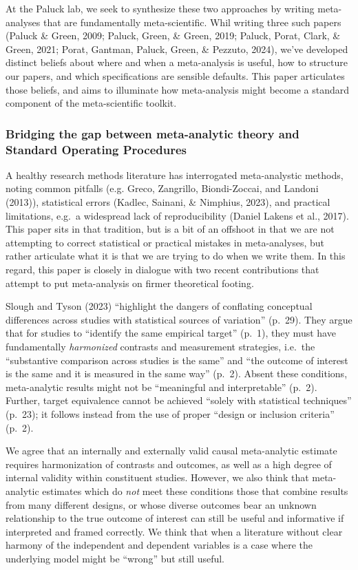 \documentclass[
  man]{apa6}
\begin{document}
At the Paluck lab, we seek to synthesize these two approaches by writing meta-analyses that are fundamentally meta-scientific. Whil writing three such papers (Paluck \& Green, 2009; Paluck, Green, \& Green, 2019; Paluck, Porat, Clark, \& Green, 2021; Porat, Gantman, Paluck, Green, \& Pezzuto, 2024), we've developed distinct beliefs about where and when a meta-analysis is useful, how to structure our papers, and which specifications are sensible defaults. This paper articulates those beliefs, and aims to illuminate how meta-analysis might become a standard component of the meta-scientific toolkit.

\subsubsection{Bridging the gap between meta-analytic theory and Standard Operating Procedures}\label{bridging-the-gap-between-meta-analytic-theory-and-standard-operating-procedures}

A healthy research methods literature has interrogated meta-analystic methods, noting common pitfalls (e.g. Greco, Zangrillo, Biondi-Zoccai, and Landoni (2013)), statistical errors (Kadlec, Sainani, \& Nimphius, 2023), and practical limitations, e.g.~a widespread lack of reproducibility (Daniel Lakens et al., 2017). This paper sits in that tradition, but is a bit of an offshoot in that we are not attempting to correct statistical or practical mistakes in meta-analyses, but rather articulate what it is that we are trying to do when we write them. In this regard, this paper is closely in dialogue with two recent contributions that attempt to put meta-analysis on firmer theoretical footing.

Slough and Tyson (2023) ``highlight the dangers of conflating conceptual differences across studies with statistical sources of variation'' (p.~29). They argue that for studies to ``identify the same empirical target'' (p.~1), they must have fundamentally \emph{harmonized} contrasts and measurement strategies, i.e.~the ``substantive comparison across studies is the same'' and ``the outcome of interest is the same and it is measured in the same way'' (p.~2). Absent these conditions, meta-analytic results might not be ``meaningful and interpretable'' (p.~2). Further, target equivalence cannot be achieved ``solely with statistical techniques'' (p.~23); it follows instead from the use of proper ``design or inclusion criteria'' (p.~2).

We agree that an internally and externally valid causal meta-analytic estimate requires harmonization of contrasts and outcomes, as well as a high degree of internal validity within constituent studies. However, we also think that meta-analytic estimates which do \emph{not} meet these conditions \textemdash those that combine results from many different designs, or whose diverse outcomes bear an unknown relationship to the true outcome of interest \textemdash can still be useful and informative if interpreted and framed correctly. We think that when a literature without clear harmony of the independent and dependent variables is a case where the underlying model might be ``wrong'' but still useful.
\end{document}
